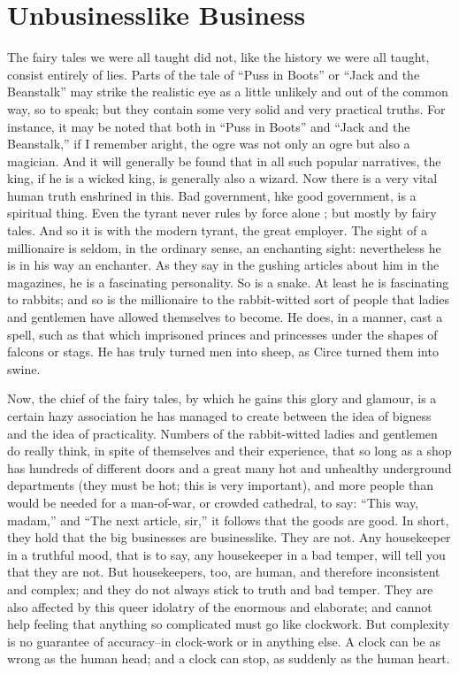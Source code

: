\documentclass{book}
\begin{document}
\chapter{Unbusinesslike Business}
\label{chapter-2}
The fairy tales we were all taught did not, like the history we were all taught, consist entirely of lies. Parts of the tale of “Puss in Boots” or “Jack and the Beanstalk” may strike the realistic eye as a little unlikely and out of the common way, so to speak; but they contain some very solid and very practical truths. For instance, it may be noted that both in “Puss in Boots” and “Jack and the Beanstalk,” if I remember aright, the ogre was not only an ogre but also a magician. And it will generally be found that in all such popular narratives, the king, if he is a wicked king, is generally also a wizard. Now there is a very vital human truth enshrined in this. Bad government, hke good government, is a spiritual thing. Even the tyrant never rules by force alone ; but mostly by fairy tales. And so it is with the modern tyrant, the great employer. The sight of a millionaire is seldom, in the ordinary sense, an enchanting sight: nevertheless he is in his way an enchanter. As they say in the gushing articles about him in the magazines, he is a fascinating personality. So is a snake. At least he is fascinating to rabbits; and so is the millionaire to the rabbit-witted sort of people that ladies and gentlemen have allowed themselves to become. He does, in a manner, cast a spell, such as that which imprisoned princes and princesses under the shapes of falcons or stags. He has truly turned men into sheep, as Circe turned them into swine.

Now, the chief of the fairy tales, by which he gains this glory and glamour, is a certain hazy association he has managed to create between the idea of bigness and the idea of practicality. Numbers of the rabbit-witted ladies and gentlemen do really think, in spite of themselves and their experience, that so long as a shop has hundreds of different doors and a great many hot and unhealthy underground departments (they must be hot; this is very important), and more people than would be needed for a man-of-war, or crowded cathedral, to say: “This way, madam,” and “The next article, sir,” it follows that the goods are good. In short, they hold that the big businesses are businesslike. They are not. Any housekeeper in a truthful mood, that is to say, any housekeeper in a bad temper, will tell you that they are not. But housekeepers, too, are human, and therefore inconsistent and complex; and they do not always stick to truth and bad temper. They are also affected by this queer idolatry of the enormous and elaborate; and cannot help feeling that anything so complicated must go like clockwork. But complexity is no guarantee of accuracy–in clock-work or in anything else. A clock can be as wrong as the human head; and a clock can stop, as suddenly as the human heart.
\end{document}
